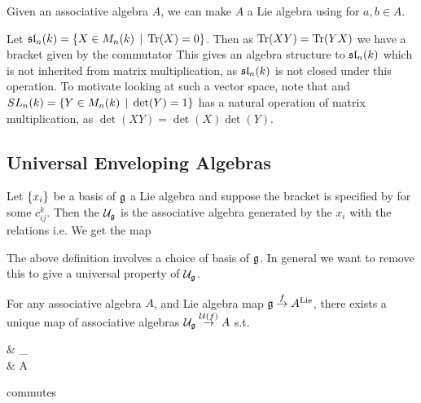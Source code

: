 \documentclass{article}
\begin{document}
\begin{example}
Given an associative algebra $A$, we can make $A$ a Lie algebra using 
for $a,b \in A$. 
\end{example}

\begin{example}
Let $\mathfrak{sl}_n(k) = \left\{ X \in M_n(k) \, \mid \, \operatorname{Tr}(X) = 0 \right\}$. Then as $\operatorname{Tr}(XY) = \operatorname{Tr}(YX)$ we have a bracket given by the commutator 
This gives an algebra structure to $\mathfrak{sl}_n(k)$ which is not inherited from matrix multiplication, as $\mathfrak{sl}_n(k)$ is not closed under this operation. To motivate looking at such a vector space, note that 
and $SL_n(k) = \left\{ Y \in M_n(k) \, \mid \, \det(Y) = 1 \right\}$ has a natural operation of matrix multiplication, as $\det(XY) = \det(X)\det(Y)$. 
\end{example}

\subsection{Universal Enveloping Algebras}

\begin{definition}
Let $\left\{ x_i \right\}$ be a basis of $\mathfrak{g}$ a Lie algebra and suppose the bracket is specified by 
for some  $c_{ij}^k$. Then the  $\mathcal{U}_{\mathfrak{g}}$ is the associative algebra generated by the $x_i$ with the relations 
i.e. 
We get the map 
\end{definition}

\begin{remark}
The above definition involves a choice of basis of $\mathfrak{g}$. In general we want to remove this to give a universal property of $\mathcal{U}_{\mathfrak{g}}$. 
\end{remark}

\begin{prop}
For any associative algebra $A$, and Lie algebra map $\mathfrak{g} \overset{f}{\to} A^{\text{Lie}}$, there exists a unique map of associative algebras $\mathcal{U}_{\mathfrak{g}} \overset{\mathcal{U}(f)}{\to} A$ s.t. 
\begin{tkz}
& _ \arrow[d,"\mc{U}(f)"] \\
 \arrow[ur,"\iota"] \arrow[r,"f"] & A
\end{tkz}
commutes
\end{prop}
\end{document}
